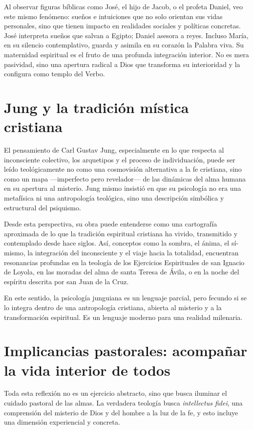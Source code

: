 \documentclass[12pt]{article}
\begin{document}
Al observar figuras bíblicas como José, el hijo de Jacob, o el profeta Daniel, veo este mismo fenómeno: sueños e intuiciones que no solo orientan sus vidas personales, sino que tienen impacto en realidades sociales y políticas concretas. José interpreta sueños que salvan a Egipto; Daniel asesora a reyes. Incluso María, en su silencio contemplativo, guarda y asimila en su corazón la Palabra viva. Su maternidad espiritual es el fruto de una profunda integración interior. No es mera pasividad, sino una apertura radical a Dios que transforma su interioridad y la configura como templo del Verbo.

\section*{Jung y la tradición mística cristiana}

El pensamiento de Carl Gustav Jung, especialmente en lo que respecta al inconsciente colectivo, los arquetipos y el proceso de individuación, puede ser leído teológicamente no como una cosmovisión alternativa a la fe cristiana, sino como un mapa —imperfecto pero revelador— de las dinámicas del alma humana en su apertura al misterio. Jung mismo insistió en que su psicología no era una metafísica ni una antropología teológica, sino una descripción simbólica y estructural del psiquismo.

Desde esta perspectiva, su obra puede entenderse como una cartografía aproximada de lo que la tradición espiritual cristiana ha vivido, transmitido y contemplado desde hace siglos. Así, conceptos como la sombra, el ánima, el sí-mismo, la integración del inconsciente y el viaje hacia la totalidad, encuentran resonancias profundas en la teología de los Ejercicios Espirituales de san Ignacio de Loyola, en las moradas del alma de santa Teresa de Ávila, o en la noche del espíritu descrita por san Juan de la Cruz.

En este sentido, la psicología junguiana es un lenguaje parcial, pero fecundo si se lo integra dentro de una antropología cristiana, abierta al misterio y a la transformación espiritual. Es un lenguaje moderno para una realidad milenaria.

\section*{Implicancias pastorales: acompañar la vida interior de todos}

Toda esta reflexión no es un ejercicio abstracto, sino que busca iluminar el cuidado pastoral de las almas. La verdadera teología busca \textit{intellectus fidei}, una comprensión del misterio de Dios y del hombre a la luz de la fe, y esto incluye una dimensión experiencial y concreta.
\end{document}
